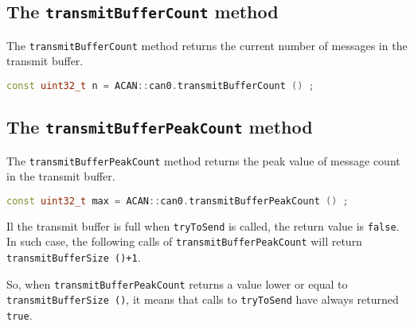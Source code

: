 \documentclass[9pt, a4paper, obeyspaces, openany]{extarticle}
\begin{document}
\subsection{The \texttt{transmitBufferCount} method}

The \texttt{transmitBufferCount} method returns the current number of messages in the transmit buffer.
{ \small\begin{lstlisting}[language=c++]
const uint32_t n = ACAN::can0.transmitBufferCount () ;
\end{lstlisting}}


\subsection{The \texttt{transmitBufferPeakCount} method}

The \texttt{transmitBufferPeakCount} method returns the peak value of message count in the transmit buffer.
{ \small\begin{lstlisting}[language=c++]
const uint32_t max = ACAN::can0.transmitBufferPeakCount () ;
\end{lstlisting}}

Il the transmit buffer is full when \texttt{tryToSend} is called, the return value is \texttt{false}. In such case, the following calls of \texttt{transmitBufferPeakCount} will return \texttt{transmitBufferSize ()+1}. 

So, when \texttt{transmitBufferPeakCount} returns a value lower or equal to \texttt{transmitBufferSize ()}, it means that calls to \texttt{tryToSend} have always returned \texttt{true}.







%
%
%
%
\end{document}
